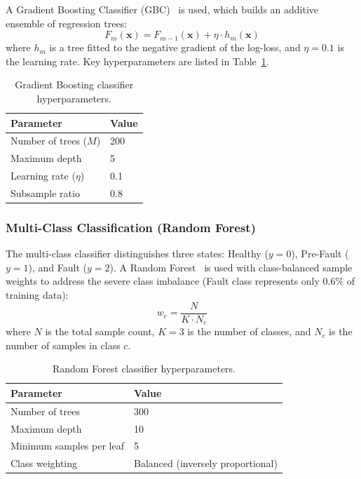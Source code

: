 \documentclass[preprint,12pt]{elsarticle}
\begin{document}
A Gradient Boosting Classifier (GBC)~\cite{friedman2001} is used, which builds an additive ensemble of regression trees:
\begin{equation}
    F_m(\mathbf{x}) = F_{m-1}(\mathbf{x}) + \eta \cdot h_m(\mathbf{x})
\end{equation}
where $h_m$ is a tree fitted to the negative gradient of the log-loss, and $\eta = 0.1$ is the learning rate. Key hyperparameters are listed in Table~\ref{tab:gbc_hyperparams}.

\begin{table}[H]
\centering
\caption{Gradient Boosting classifier hyperparameters.}
\label{tab:gbc_hyperparams}
\begin{tabular}{ll}
\toprule
Parameter & Value \\
\midrule
Number of trees ($M$) & 200 \\
Maximum depth & 5 \\
Learning rate ($\eta$) & 0.1 \\
Subsample ratio & 0.8 \\
\bottomrule
\end{tabular}
\end{table}

\subsubsection{Multi-Class Classification (Random Forest)}

The multi-class classifier distinguishes three states: Healthy ($y=0$), Pre-Fault ($y=1$), and Fault ($y=2$). A Random Forest~\cite{breiman2001} is used with class-balanced sample weights to address the severe class imbalance (Fault class represents only 0.6\% of training data):
\begin{equation}
    w_c = \frac{N}{K \cdot N_c}
\end{equation}
where $N$ is the total sample count, $K=3$ is the number of classes, and $N_c$ is the number of samples in class $c$.

\begin{table}[H]
\centering
\caption{Random Forest classifier hyperparameters.}
\label{tab:rf_hyperparams}
\begin{tabular}{ll}
\toprule
Parameter & Value \\
\midrule
Number of trees & 300 \\
Maximum depth & 10 \\
Minimum samples per leaf & 5 \\
Class weighting & Balanced (inversely proportional) \\
\bottomrule
\end{tabular}
\end{table}
\end{document}
